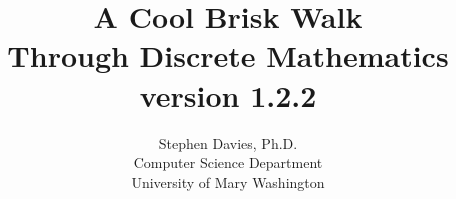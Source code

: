 \documentclass[11pt]{book}
\begin{document}
\title{A Cool Brisk Walk\\Through Discrete Mathematics\\{\small version
1.2.2}}
\author{Stephen Davies, Ph.D.\\Computer Science Department\\University of Mary Washington}
\date{}
\maketitle

\frontmatter

\renewcommand{\contentsname}{Contents at a glance}
\setcounter{tocdepth}{0}
\tableofcontents



\mainmatter













\backmatter
\printindex
\end{document}

